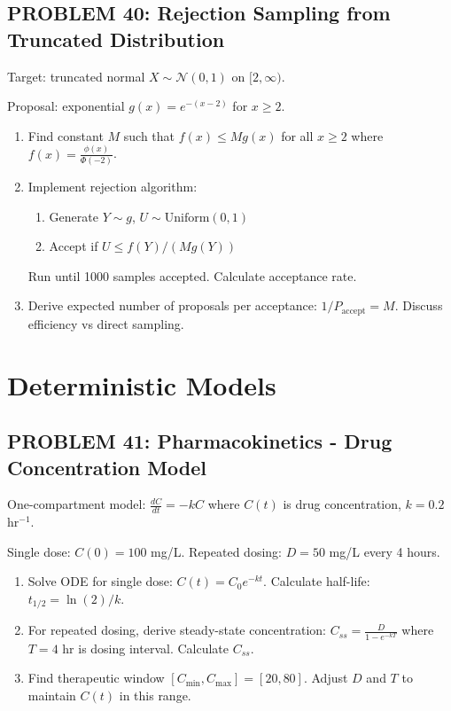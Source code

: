 \documentclass[12pt]{article}
\begin{document}
\subsection*{PROBLEM 40: Rejection Sampling from Truncated Distribution}

Target: truncated normal \(X \sim \mathcal{N}(0,1)\) on \([2, \infty)\).

Proposal: exponential \(g(x) = e^{-(x-2)}\) for \(x \geq 2\).

\begin{enumerate}
\item[(a)] Find constant \(M\) such that \(f(x) \leq Mg(x)\) for all \(x \geq 2\) where \(f(x) = \frac{\phi(x)}{\Phi(-2)}\).
\item[(b)] Implement rejection algorithm: 
\begin{enumerate}
\item Generate \(Y \sim g\), \(U \sim \text{Uniform}(0,1)\)
\item Accept if \(U \leq f(Y)/(Mg(Y))\)
\end{enumerate}
Run until 1000 samples accepted. Calculate acceptance rate.
\item[(c)] Derive expected number of proposals per acceptance: \(1/P_{\text{accept}} = M\). Discuss efficiency vs direct sampling.
\end{enumerate}

\newpage
\section*{Deterministic Models}

\subsection*{PROBLEM 41: Pharmacokinetics - Drug Concentration Model}

One-compartment model: \(\frac{dC}{dt} = -kC\) where \(C(t)\) is drug concentration, \(k=0.2\) hr\(^{-1}\).

Single dose: \(C(0) = 100\) mg/L. Repeated dosing: \(D=50\) mg/L every 4 hours.

\begin{enumerate}
\item[(a)] Solve ODE for single dose: \(C(t) = C_0e^{-kt}\). Calculate half-life: \(t_{1/2} = \ln(2)/k\).
\item[(b)] For repeated dosing, derive steady-state concentration: \(C_{ss} = \frac{D}{1-e^{-kT}}\) where \(T=4\) hr is dosing interval. Calculate \(C_{ss}\).
\item[(c)] Find therapeutic window \([C_{\min}, C_{\max}] = [20, 80]\). Adjust \(D\) and \(T\) to maintain \(C(t)\) in this range.
\end{enumerate}
\end{document}
